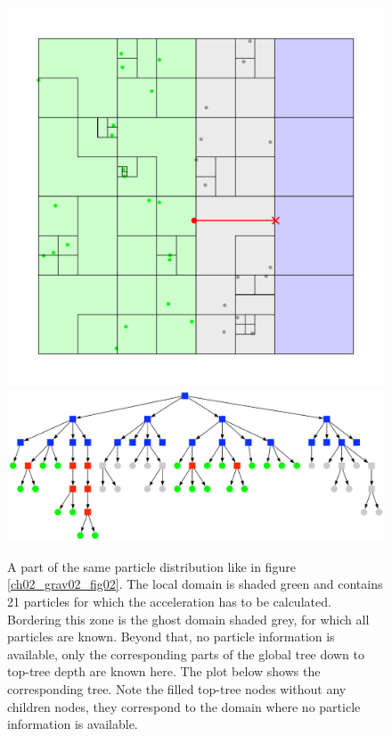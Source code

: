 \begin{figure}[htbp]
\begin{center}
\includegraphics[scale=0.6]{07quadtree50_xy_TPL2.pdf}
\includegraphics[scale=0.3]{07quadtree50_TPL2_stage3.pdf}
\caption{A part of the same particle distribution like in figure \ref{ch02_grav02_fig02}. The local domain is shaded green and contains 21 particles for which the acceleration has to be calculated. Bordering this zone is the ghost domain shaded grey, for which all particles are known. Beyond that, no particle information is available, only the corresponding parts of the global tree down to top-tree depth are known here. The plot below shows the corresponding tree. Note the filled top-tree nodes without any children nodes, they correspond to the domain where no particle information is available.}
\label{ch02_fig07}
\end{center}
\end{figure}

